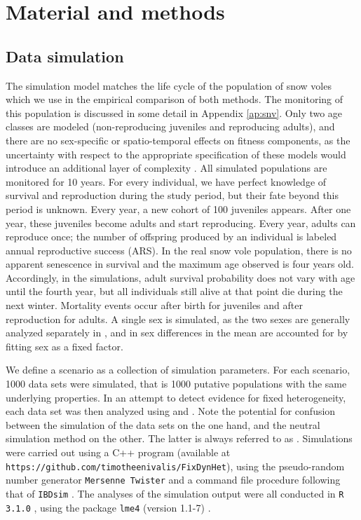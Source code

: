 \section{Material and methods}

\subsection{Data simulation}

The simulation model matches the life cycle of the population of snow voles which we use in the empirical comparison of both methods. The monitoring of this population is discussed in some detail in Appendix \ref{ap:snv}. Only two age classes are modeled (non-reproducing juveniles and reproducing adults), and there are no sex-specific or spatio-temporal effects on fitness components, as the uncertainty with respect to the appropriate specification of these models would introduce an additional layer of complexity \parencite[see e.g.][]{Cam2013}.
All simulated populations are monitored for 10 years. For every individual, we have perfect knowledge of survival and reproduction during the study period, but their fate beyond this period is unknown. Every year, a new cohort of 100 juveniles appears. After one year, these juveniles become adults and start reproducing. Every year, adults can reproduce once; the number of offspring produced by an individual is labeled annual reproductive success (ARS). In the real snow vole population, there is no apparent senescence in survival and the maximum age observed is four years old. Accordingly, in the simulations, adult survival probability does not vary with age until the fourth year, but all individuals still alive at that point die during the next winter. Mortality events occur after birth for juveniles and after reproduction for adults. A single sex is simulated, as the two sexes are generally analyzed separately in \NSM, and in \MM sex differences in the mean are accounted for by fitting sex as a fixed factor.

We define a scenario as a collection of simulation parameters. For each scenario, 1000 data sets were simulated, that is 1000 putative populations with the same underlying properties. In an attempt to detect evidence for fixed heterogeneity, each data set was then analyzed using \MM and \NSM. Note the potential for confusion between the simulation of the data sets on the one hand, and the neutral simulation method on the other. The latter is always referred to as \NSM. Simulations were carried out using a C++ program (available at \verb+https://github.com/timotheenivalis/FixDynHet+), using the pseudo-random number generator \verb+Mersenne Twister+ \parencite{Matsumoto1998} and a command file procedure following that of \verb+IBDsim+ \parencite{Leblois2009}. The analyses of the simulation output were all conducted in \verb+R 3.1.0+ \parencite{R2014}, using the package \verb+lme4+ (version 1.1-7) \parencite{Bates2014a}.

